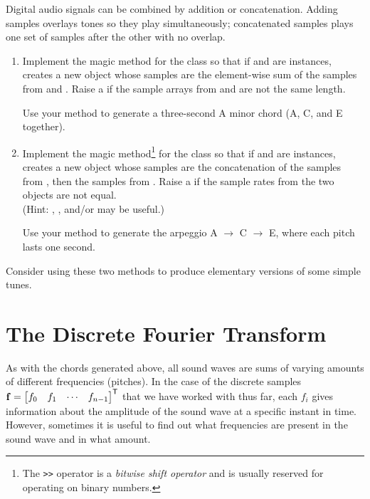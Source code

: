 \begin{problem} %
Digital audio signals can be combined by addition or concatenation.
Adding samples overlays tones so they play simultaneously; concatenated samples plays one set of samples after the other with no overlap.

\begin{enumerate}
\item Implement the  magic method for the  class so that if  and  are  instances,  creates a new  object whose samples are the element-wise sum of the samples from  and .
Raise a  if the sample arrays from  and  are not the same length.

Use your method to generate a three-second A minor chord (A, C, and E together).

\item Implement the  magic method\footnote{The \lstinline[basicstyle=\footnotesize\ttfamily]{>>} operator is a \emph{bitwise shift operator} and is usually reserved for operating on binary numbers.} for the  class so that if  and  are  instances,  creates a new  object whose samples are the concatenation of the samples from , then the samples from .
Raise a  if the sample rates from the two objects are not equal.
\\(Hint: , , and/or  may be useful.)

Use your method to generate the arpeggio A $\rightarrow$ C $\rightarrow$ E, where each pitch lasts one second.

\end{enumerate}
Consider using these two methods to produce elementary versions of some simple tunes.
\label{prob:minor_chord_example}
\end{problem}

\section*{The Discrete Fourier Transform} %

As with the chords generated above, all sound waves are sums of varying amounts of different frequencies (pitches).
In the case of the discrete samples $\mathbf{f} = \begin{bmatrix}f_0 & f_1 & \cdots & f_{n-1}\end{bmatrix}^{\mathsf T}$ that we have worked with thus far, each $f_i$ gives information about the amplitude of the sound wave at a specific instant in time. 
However, sometimes it is useful to find out what frequencies are present in the sound wave and in what amount.

